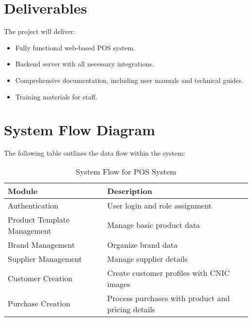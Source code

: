 \documentclass[a4paper,12pt]{article}
\begin{document}
\section{Deliverables}
The project will deliver:
\begin{itemize}
    \item Fully functional web-based POS system.
    \item Backend server with all necessary integrations.
    \item Comprehensive documentation, including user manuals and technical guides.
    \item Training materials for staff.
\end{itemize}

\section{System Flow Diagram}
The following table outlines the data flow within the system:
\begin{table}[h]
    \centering
    \begin{tabular}{ll}
        \toprule
        \textbf{Module} & \textbf{Description} \\
        \midrule
        Authentication & User login and role assignment \\
        Product Template Management & Manage basic product data \\
        Brand Management & Organize brand data \\
        Supplier Management & Manage supplier details \\
        Customer Creation & Create customer profiles with CNIC images \\
        Purchase Creation & Process purchases with product and pricing details \\
        \bottomrule
    \end{tabular}
    \caption{System Flow for POS System}
\end{table}
\end{document}
